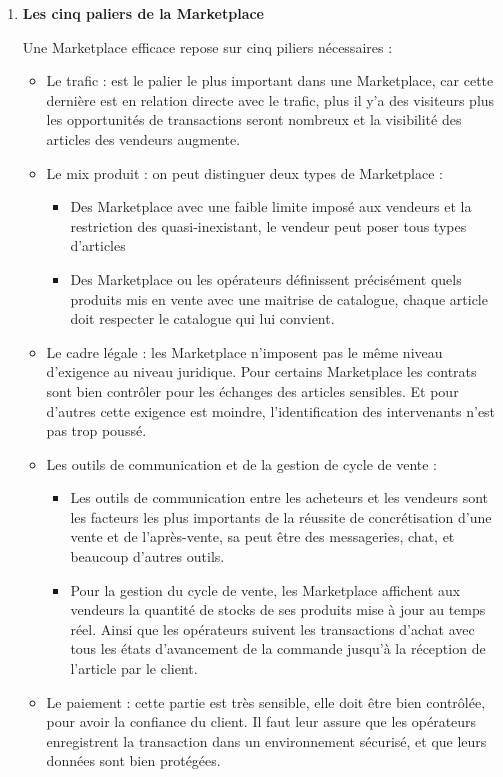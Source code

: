 \begin{enumerate}
\item \textbf{Les cinq paliers de la Marketplace}

 Une Marketplace efficace repose sur cinq piliers nécessaires : \cite{Ref5}
 
 \begin{itemize}[label=\textbullet, font=\LARGE \color{blue}]
	\item Le trafic : est le palier le plus important dans une Marketplace, car cette dernière est en relation directe avec le trafic, plus il y’a des visiteurs plus les opportunités de transactions seront nombreux et la visibilité des articles des vendeurs augmente.
	\item Le mix produit : on peut distinguer deux types de Marketplace :
		\begin{itemize}[label=\textbullet, font=\LARGE \color{black}]
			\item Des Marketplace avec une faible limite imposé aux vendeurs et la restriction des quasi-inexistant, le vendeur peut poser tous types d’articles
			\item Des Marketplace ou les opérateurs définissent précisément quels produits mis en vente avec une maitrise de catalogue, chaque article doit respecter le catalogue qui lui convient.
		\end{itemize}
	\item Le cadre légale : les Marketplace n’imposent pas le même niveau d’exigence au niveau juridique. Pour certains Marketplace les contrats sont bien contrôler pour les échanges des articles sensibles. Et pour d’autres cette exigence est moindre, l’identification des intervenants n’est pas trop poussé.
	\item Les outils de communication et de la gestion de cycle de vente : 
		\begin{itemize}[label=\textbullet, font=\LARGE \color{black}]
			\item Les outils de communication entre les acheteurs et les vendeurs sont les facteurs les plus importants de la réussite de concrétisation d’une vente et de l’après-vente, sa peut être des messageries, chat, et beaucoup d’autres outils.
			\item Pour la gestion du cycle de vente, les Marketplace affichent aux vendeurs la quantité de stocks de ses produits mise à jour au temps réel. Ainsi que les opérateurs suivent les transactions d’achat avec tous les états d’avancement de la commande jusqu’à la réception de l’article par le client.
		\end{itemize}
	\item Le paiement : cette partie est très sensible, elle doit être bien contrôlée, pour avoir la confiance du client. Il faut leur assure que les opérateurs enregistrent la transaction dans un environnement sécurisé, et que leurs données sont bien protégées.
\end{itemize}
\end{enumerate}


